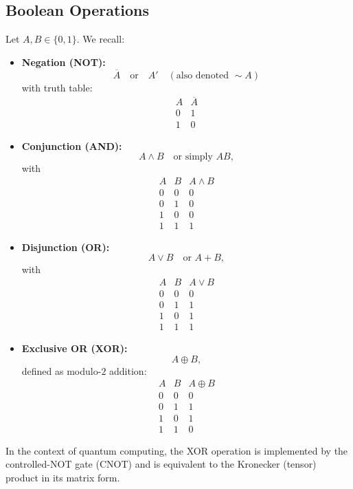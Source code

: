 \documentclass[11pt,oneside]{book}
\theoremstyle{remark}
\begin{document}
	\subsection*{Boolean Operations}
	Let $A,B\in \{0,1\}$. We recall:
	\begin{itemize}[leftmargin=*, labelsep=5mm]
		\item \textbf{Negation (NOT):} 
		\[
		\overline{A} \quad \text{or} \quad A' \quad (\text{also denoted } \sim A)
		\]
		with truth table:
		\[
		\begin{array}{c|c}
			A & \overline{A} \\
			\hline
			0 & 1 \\
			1 & 0
		\end{array}
		\]
		\item \textbf{Conjunction (AND):}
		\[
		A \land B \quad \text{or simply } AB,
		\]
		with
		\[
		\begin{array}{cc|c}
			A & B & A \land B \\
			\hline
			0 & 0 & 0 \\
			0 & 1 & 0 \\
			1 & 0 & 0 \\
			1 & 1 & 1
		\end{array}
		\]
		\item \textbf{Disjunction (OR):}
		\[
		A \lor B \quad \text{or } A+B,
		\]
		with
		\[
		\begin{array}{cc|c}
			A & B & A \lor B \\
			\hline
			0 & 0 & 0 \\
			0 & 1 & 1 \\
			1 & 0 & 1 \\
			1 & 1 & 1
		\end{array}
		\]
		\item \textbf{Exclusive OR (XOR):}
		\[
		A \oplus B,
		\]
		defined as modulo-$2$ addition:
		\[
		\begin{array}{cc|c}
			A & B & A \oplus B \\
			\hline
			0 & 0 & 0 \\
			0 & 1 & 1 \\
			1 & 0 & 1 \\
			1 & 1 & 0
		\end{array}
		\]
	\end{itemize}
	
	In the context of quantum computing, the XOR operation is implemented by the controlled-NOT gate (CNOT) and is equivalent to the Kronecker (tensor) product in its matrix form.
	
\end{document}
